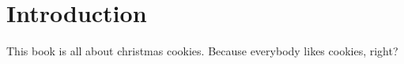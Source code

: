 \chapter{Introduction}
This book is all about christmas cookies. Because everybody likes cookies, right?
